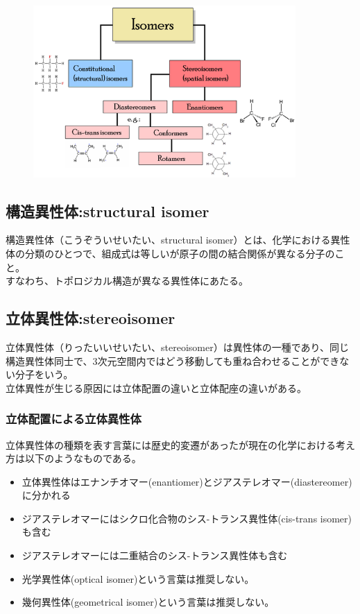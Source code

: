 \documentclass[dvipdfmx,uplatex]{jsarticle}
\begin{document}
\begin{figure}[htbp]
\begin{center}
\includegraphics[width=100mm]{600px-Isomerism.png}
\end{center}
\end{figure}

\subsection{構造異性体:structural isomer}
構造異性体（こうぞういせいたい、structural isomer）とは、化学における異性体の分類のひとつで、組成式は等しいが原子の間の結合関係が異なる分子のこと。 \\
すなわち、トポロジカル構造が異なる異性体にあたる。 \\

\subsection{立体異性体:stereoisomer}
立体異性体（りったいいせいたい、stereoisomer）は異性体の一種であり、同じ構造異性体同士で、3次元空間内ではどう移動しても重ね合わせることができない分子をいう。 \\
立体異性が生じる原因には立体配置の違いと立体配座の違いがある。

\subsubsection{立体配置による立体異性体}

立体異性体の種類を表す言葉には歴史的変遷があったが現在の化学における考え方は以下のようなものである。
\begin{itemize}
\item 立体異性体はエナンチオマー(enantiomer)とジアステレオマー(diastereomer)に分かれる
\item ジアステレオマーにはシクロ化合物のシス-トランス異性体(cis-trans isomer)も含む
\item ジアステレオマーには二重結合のシス-トランス異性体も含む
\item 光学異性体(optical isomer)という言葉は推奨しない。
\item 幾何異性体(geometrical isomer)という言葉は推奨しない。
\end{itemize}
\end{document}
